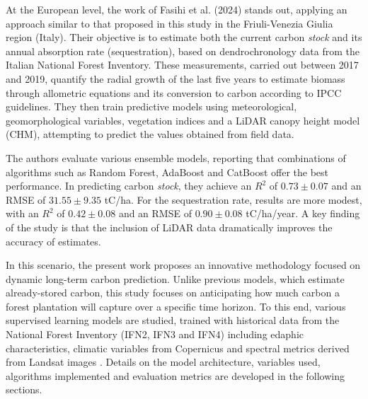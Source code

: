 At the European level, the work of Fasihi et al. (2024) \cite{fasihi2024assessing} stands out, applying an approach similar to that proposed in this study in the Friuli-Venezia Giulia region (Italy). Their objective is to estimate both the current carbon \textit{stock} and its annual absorption rate (sequestration), based on dendrochronology data from the Italian National Forest Inventory. These measurements, carried out between 2017 and 2019, quantify the radial growth of the last five years to estimate biomass through allometric equations and its conversion to carbon according to IPCC guidelines. They then train predictive models using meteorological, geomorphological variables, vegetation indices and a LiDAR canopy height model (CHM), attempting to predict the values obtained from field data.

The authors evaluate various ensemble models, reporting that combinations of algorithms such as Random Forest, AdaBoost and CatBoost offer the best performance. In predicting carbon \textit{stock}, they achieve an $R^2$ of $0.73 \pm 0.07$ and an RMSE of $31.55 \pm 9.35$ tC/ha. For the sequestration rate, results are more modest, with an $R^2$ of $0.42 \pm 0.08$ and an RMSE of $0.90 \pm 0.08$ tC/ha/year. A key finding of the study is that the inclusion of LiDAR data dramatically improves the accuracy of estimates.




In this scenario, the present work proposes an innovative methodology focused on dynamic long-term carbon prediction. Unlike previous models, which estimate already-stored carbon, this study focuses on anticipating how much carbon a forest plantation will capture over a specific time horizon. To this end, various supervised learning models are studied, trained with historical data from the National Forest Inventory (IFN2, IFN3 and IFN4) \cite{ifn} including edaphic characteristics, climatic variables from Copernicus \cite{copernicus_temps,copernicus_pr} and spectral metrics derived from Landsat images \cite{landsat5_data}. Details on the model architecture, variables used, algorithms implemented and evaluation metrics are developed in the following sections.




